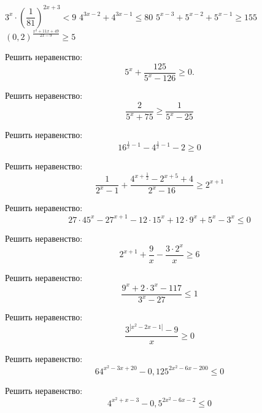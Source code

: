 \begin{class}[number=1]
\begin{listofex}
\begin{tasks}
			\task \( 3^x \cdot \left( \dfrac{ 1 }{ 81 } \right)^{2x+3} < 9 \)
			\task \( 4^{3x-2}+4^{3x-1} \le 80 \)
			\task \( 5^{x-3}+5^{x-2}+5^{x-1} \ge 155 \)
			\task \( (0,2)^{\tfrac{x^2+11x+49}{2x-9}} \ge 5 \)
		\end{tasks}
	\end{listofex}
\end{class}

\begin{class}[number=2]
	\begin{listofex}
		\item Решить неравенство: 
		\[ 5^x+\dfrac{125}{5^x-126}\ge 0. \]
		\item Решить неравенство:
		\[ \dfrac{2}{5^x+75} \ge \dfrac{1}{5^x-25} \]
		\item Решить неравенство:
		\[ 16^{\tfrac{1}{x}-1}-4^{\tfrac{1}{x}-1}-2 \ge 0 \]
		\item Решить неравенство:
		\[ \dfrac{1}{2^x-1}+\dfrac{4^{x+\tfrac{1}{2}}-2^{x+5}+4}{2^x-16} \ge 2^{x+1} \]
		\item Решить неравенство:
		\[ 27\cdot45^x-27^{x+1}-12\cdot15^x+12\cdot9^x+5^x-3^x \le 0  \]
		\item Решить неравенство:
		\[ 2^{x+1}+\dfrac{9}{x}-\dfrac{3\cdot2^x}{x}\ge 6 \]
		\item Решить неравенство:
		\[ \dfrac{9^x+2 \cdot 3^x-117}{3^x-27} \le 1 \]
		\item Решить неравенство: \[ \dfrac{ 3^{|x^2-2x-1|}-9}{ x } \ge 0 \]
		
		
		\item Решить неравенство: \[ 64^{x^2-3x+20}-0,125^{2x^2-6x-200} \le 0 \]
		\item Решить неравенство: \[ 4^{x^2+x-3}-0,5^{2x^2-6x-2} \le 0 \]
	\end{listofex}
\end{class}


